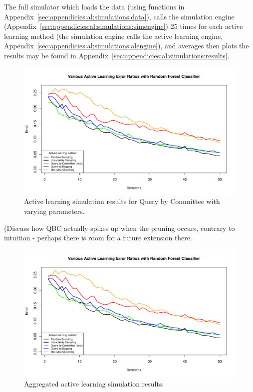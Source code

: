 The full simulator which loads the data (using functions in 
Appendix~\ref{sec:appendicies:al:simulations:data}), calls the simulation 
engine (Appendix~\ref{sec:appendicies:al:simulations:simengine}) 25 times for 
each active learning method (the simulation engine calls the active learning 
engine, Appendix~\ref{sec:appendicies:al:simulations:alengine}), and averages 
then plots the results may be found in 
Appendix~\ref{sec:appendicies:al:simulations:results}.

\begin{figure}[htb]
	\begin{center}
		\includegraphics[width=1\linewidth,page=2]{ch-al/figures/results.pdf}
		\caption[Active learning simulation results for Query by Committee with 
		varying parameters.]{Active learning simulation results for Query by 
			Committee with varying parameters.}
		\label{fig:al:simulations:resultsqbc}
	\end{center}
\end{figure}

(Discuss how QBC actually spikes up when the pruning occurs, contrary to 
intuition - perhaps there is room for a future extension there. 

\begin{figure}[htb]
	\begin{center}
		\includegraphics[width=1\linewidth,page=1]{ch-al/figures/results.pdf}
		\caption[Aggregated active learning simulation results.]{ 
		Aggregated active learning simulation results.}
		\label{fig:al:simulations:results}
	\end{center}
\end{figure}

